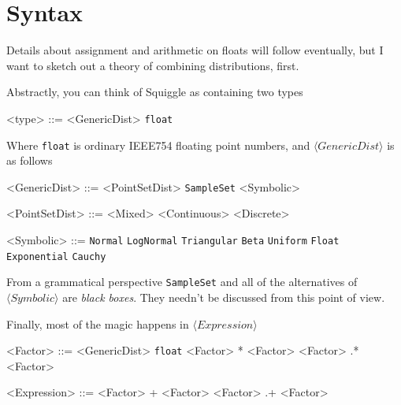 \documentclass[../main.tex]{subfiles}
\begin{document}
\section{Syntax}\label{section:syntax}

Details about assignment and arithmetic on floats will follow eventually, but I want to sketch out a theory of combining distributions, first.

Abstractly, you can think of Squiggle as containing two types
\begin{grammar}
  <type> ::= <GenericDist> \alt \texttt{float}
\end{grammar}\label{gram:type}

Where \texttt{float} is ordinary IEEE754 floating point numbers, and $\langle \textit{GenericDist} \rangle$ is as follows

\begin{grammar}
  <GenericDist> ::= <PointSetDist> \alt \texttt{SampleSet} \alt <Symbolic>

  <PointSetDist> ::= <Mixed> \alt <Continuous> \alt <Discrete>

  <Symbolic> ::= \texttt{Normal} \alt \texttt{LogNormal} \alt \texttt{Triangular} \alt \texttt{Beta} \alt \texttt{Uniform} \alt \texttt{Float} \alt \texttt{Exponential} \alt \texttt{Cauchy}
\end{grammar}

From a grammatical perspective \texttt{SampleSet} and all of the alternatives of $\langle \textit{Symbolic} \rangle$ are \textit{black boxes}. They needn't be discussed from this point of view.

Finally, most of the magic happens in $\langle \textit{Expression} \rangle$

\begin{grammar}
  <Factor> ::= <GenericDist> \alt \texttt{float} \alt <Factor> * <Factor> \alt <Factor> .* <Factor>

  <Expression> ::= <Factor> + <Factor> \alt <Factor> .+ <Factor>
\end{grammar}
\end{document}
